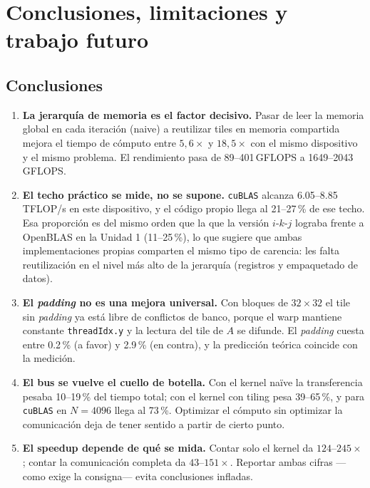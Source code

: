 \section{Conclusiones, limitaciones y trabajo futuro}
\label{sec:observaciones}

\subsection{Conclusiones}

	\begin{enumerate}
		\item \textbf{La jerarquía de memoria es el factor decisivo.} Pasar de leer la memoria global en cada iteración (naive) a reutilizar tiles en memoria compartida mejora el tiempo de cómputo entre $5{,}6\times$ y $18{,}5\times$ con el mismo dispositivo y el mismo problema. El rendimiento pasa de 89--401\,GFLOPS a 1649--2043\,GFLOPS.
		\item \textbf{El techo práctico se mide, no se supone.} \texttt{cuBLAS} alcanza 6.05--8.85\,TFLOP/s en este dispositivo, y el código propio llega al 21--27\,\% de ese techo. Esa proporción es del mismo orden que la que la versión $i\text{-}k\text{-}j$ lograba frente a OpenBLAS en la Unidad 1 (11--25\,\%), lo que sugiere que ambas implementaciones propias comparten el mismo tipo de carencia: les falta reutilización en el nivel más alto de la jerarquía (registros y empaquetado de datos).
		\item \textbf{El \textit{padding} no es una mejora universal.} Con bloques de $32 \times 32$ el tile sin \textit{padding} ya está libre de conflictos de banco, porque el warp mantiene constante \texttt{threadIdx.y} y la lectura del tile de $A$ se difunde. El \textit{padding} cuesta entre 0.2\,\% (a favor) y 2.9\,\% (en contra), y la predicción teórica coincide con la medición.
		\item \textbf{El bus se vuelve el cuello de botella.} Con el kernel naïve la transferencia pesaba 10--19\,\% del tiempo total; con el kernel con tiling pesa 39--65\,\%, y para \texttt{cuBLAS} en $N=4096$ llega al 73\,\%. Optimizar el cómputo sin optimizar la comunicación deja de tener sentido a partir de cierto punto.
		\item \textbf{El speedup depende de qué se mida.} Contar solo el kernel da $124\text{--}245\times$; contar la comunicación completa da $43\text{--}151\times$. Reportar ambas cifras —como exige la consigna— evita conclusiones infladas.
	\end{enumerate}

